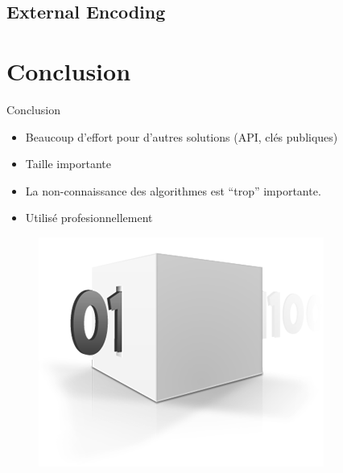 \documentclass{beamer}
\begin{document}
\subsection{External Encoding}

\section{Conclusion}

\begin{frame}{Conclusion}
  
  \begin{itemize}
  \item Beaucoup d'effort pour d'autres solutions (API, clés publiques)
  \item Taille importante
  \item La non-connaissance des algorithmes est ``trop'' importante.
  \item Utilisé profesionnellement
  \end{itemize}

\begin{figure}[h]
  \centering
  \includegraphics[scale=0.6]{./images/conclusion.png}
\end{figure}

\end{frame}
\end{document}
